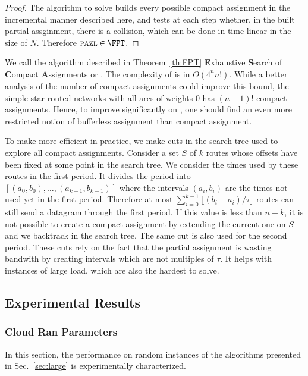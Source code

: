 \begin{proof}
The algorithm to solve \pazl builds every possible compact assignment in the incremental manner described here, and tests at each step whether, in the built partial assginment, there is a collision, which can be done in time linear in the size of $N$. Therefore $\pazl \in \FPT$.
\end{proof}


We call the algorithm described in Theorem~\ref{th:FPT} \textbf{E}xhaustive \textbf{S}earch of \textbf{C}ompact \textbf{A}ssignments or \ESCA. The complexity of \ESCA is in $O(4^n n!)$. While a better analysis of the number of compact assignments could improve this bound, the simple star routed networks with all arcs of weights $0$ has $(n-1)!$ compact assignments. Hence, to improve significantly on \ESCA, one should find an even more restricted notion of bufferless assignment than compact assignment.

To make \ESCA more efficient in practice, we make cuts in the search tree used to explore all compact assignments. Consider a set $S$ of $k$ routes whose offsets have been fixed at some point in the search tree. We consider the times used by these routes in the first period. It divides the period into $[(a_0,b_0), \dots, (a_{k-1},b_{k-1})]$ where the intervals $(a_i,b_i)$ are the times not used yet in the first period. Therefore at most $\displaystyle{ \sum_{i=0}^{k-1} \lfloor(b_{i} -a_i)/\tau\rfloor}$ routes can still send a datagram through the first period. If this value is less than $n - k$, it is not possible to create a compact assignment by extending the current one on $S$ and we backtrack in the search tree. The same cut is also used for the second period. These cuts rely on the fact that the partial assignment is wasting bandwith by creating intervals which are not multiples of $\tau$. It helps with instances of large load, which are also the hardest to solve.


\subsection{Experimental Results} \label{sec:perf_large}

\subsubsection{Cloud Ran Parameters}\label{sec:pazlcran}
In this section, the performance on random instances of the algorithms presented in Sec.~\ref{sec:large} is experimentally characterized.

